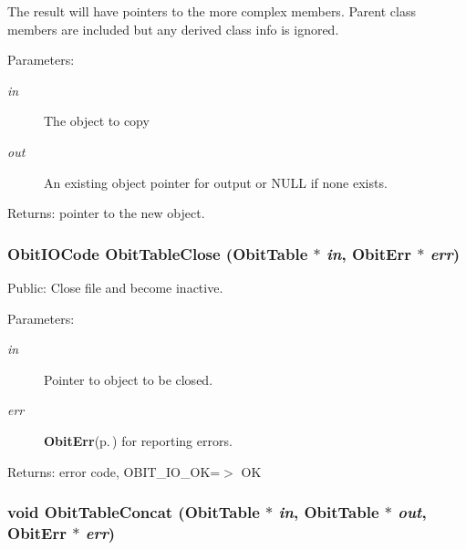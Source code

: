The result will have pointers to the more complex members. Parent class members are included but any derived class info is ignored. \begin{Desc}
\item[Parameters:]
\begin{description}
\item[{\em in}]The object to copy \item[{\em out}]An existing object pointer for output or NULL if none exists. \end{description}
\end{Desc}
\begin{Desc}
\item[Returns:]pointer to the new object. \end{Desc}
\subsubsection{\setlength{\rightskip}{0pt plus 5cm}Obit\-IOCode Obit\-Table\-Close ({\bf Obit\-Table} $\ast$ {\em in}, {\bf Obit\-Err} $\ast$ {\em err})}\label{ObitTable_8c_a23}


Public: Close file and become inactive. 

\begin{Desc}
\item[Parameters:]
\begin{description}
\item[{\em in}]Pointer to object to be closed. \item[{\em err}]{\bf Obit\-Err}{\rm (p.\,\pageref{structObitErr})} for reporting errors. \end{description}
\end{Desc}
\begin{Desc}
\item[Returns:]error code, OBIT\_\-IO\_\-OK=$>$ OK \end{Desc}
\subsubsection{\setlength{\rightskip}{0pt plus 5cm}void Obit\-Table\-Concat ({\bf Obit\-Table} $\ast$ {\em in}, {\bf Obit\-Table} $\ast$ {\em out}, {\bf Obit\-Err} $\ast$ {\em err})}\label{ObitTable_8c_a21}


